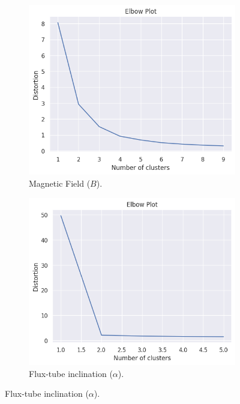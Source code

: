 \begin{figure}[]
    \caption{TimeSeriesKMeans Elbow Tests}
    \begin{subfigure}[h]{0.48\textwidth}
        \centering
        \includegraphics[width=\textwidth]{figures/tskmeans_elbow_b.png}
        \caption{Magnetic Field ($B$).}
        \label{fig:elbow_b}
    \end{subfigure}
    \hfill
    \begin{subfigure}[h]{0.48\textwidth}
        \centering
        \includegraphics[width=\textwidth]{figures/tskmeans_elbow_alpha.png}
        \caption{Flux-tube inclination ($\alpha$).}
        \label{fig:elbow_alpha}
    \end{subfigure}
\end{figure}


